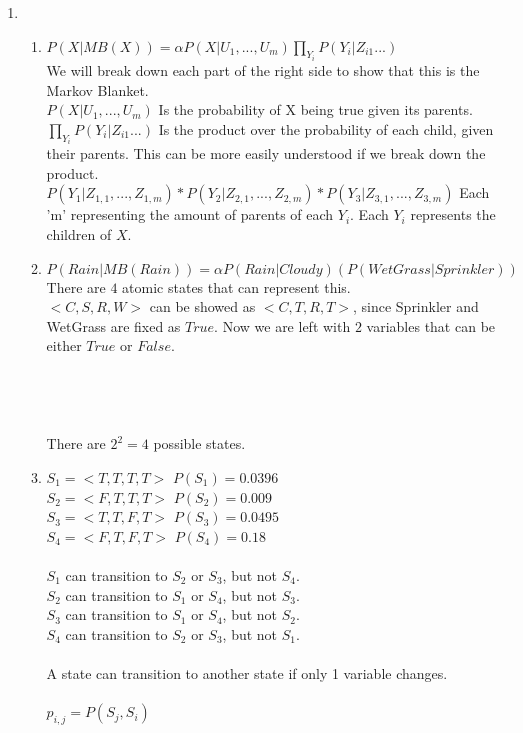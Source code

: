 \documentclass[12pt,a4paper]{report}
\begin{document}
\begin{enumerate}
\begin{enumerate}
\end{enumerate}

\pagebreak
\item
\begin{enumerate}
	\item
	$P(X|MB(X)) = \alpha P(X|U_1, ... , U_m)\prod_{Y_{i}}P(Y_i|Z_{i1}...)$\\
	We will break down each part of the right side to show that this is the Markov Blanket.\\
	$P(X|U_1, ... , U_m)$ Is the probability of X being true given its parents.\\
	$\prod_{Y_{i}}P(Y_i|Z_{i1}...)$ Is the product over the probability of each child, given their parents. This can be more easily understood if we break down the product.\\
	$P(Y_1|Z_{1,1}, ... , Z_{1,m})*P(Y_2|Z_{2,1}, ... ,Z_{2,m})*P(Y_3|Z_{3,1}, ... , Z_{3,m})$ Each 'm' representing the amount of parents of each $Y_i$. Each $Y_i$ represents the children of $X$.\\
	
	\item
	$P(Rain|MB(Rain)) = \alpha P(Rain|Cloudy)(P(WetGrass|Sprinkler))$\\
	There are $4$ atomic states that can represent this.\\
	$<C,S,R,W>$ can be showed as $<C,T,R,T>$, since Sprinkler and WetGrass are fixed as $True$. Now we are left with $2$ variables that can be either $True$ or $False$.\\
	\\
	\\
	\\
	\\
	There are $2^2 = 4$ possible states.\\
	
	\item
	$S_1 = <T,T,T,T>$ $P(S_1) = 0.0396$\\
	$S_2 = <F,T,T,T>$ $P(S_2) = 0.009$\\
	$S_3 = <T,T,F,T>$ $P(S_3) = 0.0495$\\
	$S_4 = <F,T,F,T>$ $P(S_4) = 0.18$\\
	\\$S_1$ can transition to $S_2$ or $S_3$, but not $S_4$.\\
	$S_2$ can transition to $S_1$ or $S_4$, but not $S_3$.\\
	$S_3$ can transition to $S_1$ or $S_4$, but not $S_2$.\\
	$S_4$ can transition to $S_2$ or $S_3$, but not $S_1$.\\
	\\A state can transition to another state if only 1 variable changes.\\
	\\$p_{i,j} = P(S_j,S_i)$\\
	

\end{enumerate}
\end{enumerate}
\end{document}
